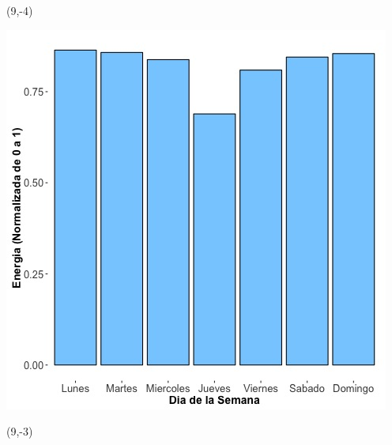 \documentclass{article}\usepackage[]{graphicx}\usepackage[]{color}
\newenvironment{knitrout}{}{} %
\begin{document}
 \begin{textblock}{1}(9,-4)
\begin{minipage}{20em}
\begingroup

\endgroup
\end{minipage}
\end{textblock}


\begin{knitrout}
\color{fgcolor}
\includegraphics[scale=0.65]{figure/A9_day_of_week_plot} 
\end{knitrout}


 \begin{textblock}{1}(9,-3)
\begin{minipage}{20em}
\begingroup

\endgroup
\end{minipage}
\end{textblock}
\end{document}
